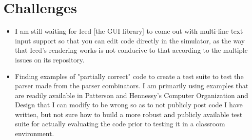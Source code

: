 \documentclass{article}
\begin{document}
\section{Challenges}
\begin{itemize}
    \item I am still waiting for Iced [the GUI library] to come out with multi-line text input support so that you can edit code directly in the simulator, as the way that Iced's rendering works is not conducive to that according to the multiple issues on its repository.
    \item Finding examples of "partially correct" code to create a test suite to test the parser made from the parser combinators. I am primarily using examples that are readily available in Patterson and Hennessy's Computer Organization and Design that I can modify to be wrong so as to not publicly post code I have written, but not sure how to build a more robust and publicly available test suite for actually evaluating the code prior to testing it in a classroom environment.
\end{itemize}
\end{document}
